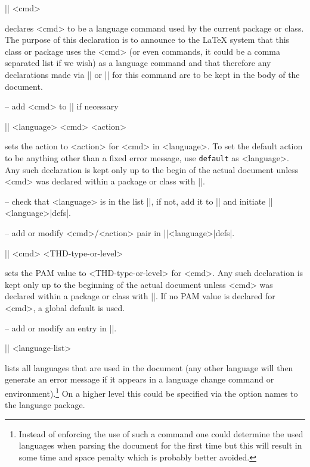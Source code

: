 \documentclass{ltxguide}
\begin{document}
\begin{decl}
|\DeclareLanguageCommand| <cmd>
\end{decl}

declares <cmd> to be a language command used by the current package or
class. The purpose of this declaration is to announce to the \LaTeX{}
system that this class or package uses the <cmd> (or even commands, it
could be a comma separated list if we wish) as a language command and
that therefore any declarations made via |\SetLATvalue| or
|\SetPAMvalue| for this command are to be kept in the body of the
document.

-- add <cmd> to |\usedlanguagecmds| if necessary



\begin{decl}
|\SetLATvalue| <language> <cmd> <action>
\end{decl}

sets the action to <action> for <cmd> in <language>. To set the
default action to be anything other than a fixed error message, use
\texttt{default} as <language>. Any such declaration is kept only up
to the begin of the actual document unless <cmd> was declared within a
package or class with |\DeclareLanguageCommand|.

-- check that <language> is in the list |\knownlanguages|, if not, add
it to |\knownlanguages| and initiate |\language|<language>|defs|.

-- add or modify <cmd>/<action> pair in |\language|<language>|defs|.




\begin{decl}
|\SetPAMvalue| <cmd> <THD-type-or-level>
\end{decl}

sets the PAM value to <THD-type-or-level> for <cmd>. Any such
declaration is kept only up to the beginning of the actual document
unless <cmd> was declared within a package or class with
|\DeclareLanguageCommand|.  If no PAM value is declared for <cmd>, a
global default is used.

-- add or modify an entry in |\knownPAMvalues|.


\begin{decl}
|\DeclareDocumentLanguages| <language-list>
\end{decl}

lists all languages that are used in the document (any other language
will then generate an error message if it appears in a language change
command or environment).\footnote{Instead of enforcing the use of such a
command one could determine the used languages when parsing the
document for the first time but this will result in some time and
space penalty which is probably better avoided.} On a higher level
this could be specified via the option names to the language package.
\end{document}

